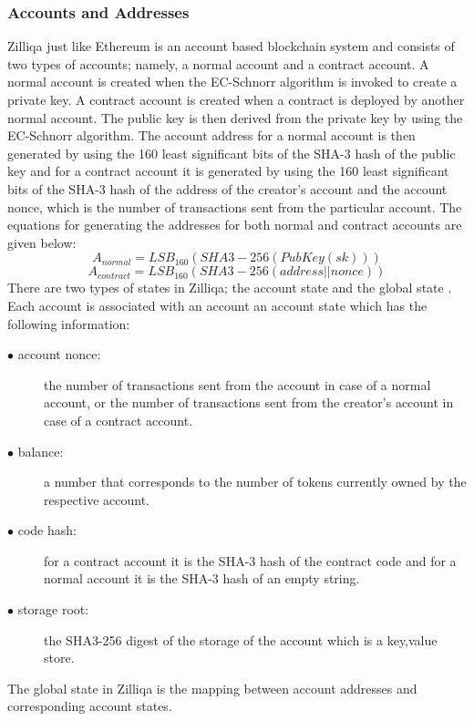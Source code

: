 \documentclass[a4paper,twoside,phd]{BYUPhys}
\begin{document}
\subsubsection{Accounts and Addresses}
Zilliqa just like Ethereum is an account based blockchain system and consists of two types of accounts; namely, a normal account and a contract account\cite{TheZilliqaTeam2017TheWhitepaper}. A normal account is created when the EC-Schnorr algorithm is invoked to create a private key\cite{TheZilliqaTeam2017TheWhitepaper}. A contract account is created when a contract is deployed by another normal account\cite{TheZilliqaTeam2017TheWhitepaper}. The public key is then derived from the private key by using the EC-Schnorr algorithm\cite{TheZilliqaTeam2017TheWhitepaper}. The account address for a normal account is then generated by using the 160 least significant bits of the SHA-3 hash of the public key and for a contract account it is generated by using the 160 least significant bits of the SHA-3 hash of the address of the creator's account and the account nonce, which is the number of transactions sent from the particular account\cite{TheZilliqaTeam2017TheWhitepaper}. The equations for generating the addresses for both normal and contract accounts are given below\cite{TheZilliqaTeam2017TheWhitepaper}:
\begin{equation}
    A_{normal} = LSB_{160}(SHA3-256(PubKey(sk)))
\end{equation}
\begin{equation}
    A_{contract} = LSB_{160}(SHA3-256(address||nonce))
\end{equation}
There are two types of states in Zilliqa; the account state and the global state \cite{TheZilliqaTeam2017TheWhitepaper}.
Each account is associated with an account an account state which has the following information\cite{TheZilliqaTeam2017TheWhitepaper}:
\begin{description}
\item[$\bullet$ account nonce:] the number of transactions sent from the account in case of a normal account, or the number of transactions sent from the creator's account in case of a contract account.
\item[$\bullet$ balance:] a number that corresponds to the number of tokens currently owned by the respective account.
\item[$\bullet$ code hash:] for a contract account it is the SHA-3 hash of the contract code and for a normal account it is the SHA-3 hash of an empty string.
\item[$\bullet$ storage root:] the SHA3-256 digest of the storage of the account which is a key,value store.
\end{description}
The global state in Zilliqa is the mapping between account addresses and corresponding account states\cite{TheZilliqaTeam2017TheWhitepaper}. 
\end{document}
